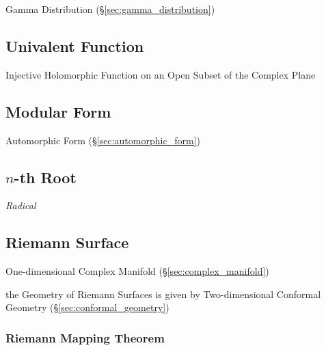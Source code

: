 Gamma Distribution (\S\ref{sec:gamma_distribution})



\subsection{Univalent Function}\label{sec:univalent_function}

Injective Holomorphic Function on an Open Subset of the Complex Plane



\subsection{Modular Form}\label{sec:modular_form}

Automorphic Form (\S\ref{sec:automorphic_form})



\subsection{$n$-th Root}\label{sec:nth_root}

\emph{Radical}



\subsection{Riemann Surface}\label{sec:riemann_surface}

One-dimensional Complex Manifold (\S\ref{sec:complex_manifold})

the Geometry of Riemann Surfaces is given by Two-dimensional Conformal
Geometry (\S\ref{sec:conformal_geometry})



\subsubsection{Riemann Mapping Theorem}
\label{sec:riemann_mapping_theorem}

